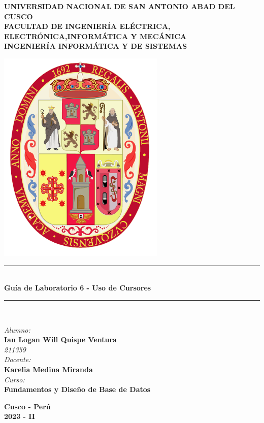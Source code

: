 \documentclass[a4paper]{article}
\begin{document}
\begin{titlepage}

\newcommand{\linea}{\rule{\linewidth}{0.7mm}} 
\center
\textbf{\Large UNIVERSIDAD NACIONAL DE SAN ANTONIO ABAD DEL CUSCO}\\[0.2cm]
\textbf{\Large FACULTAD DE INGENIERÍA ELÉCTRICA, ELECTRÓNICA,INFORMÁTICA Y MECÁNICA}\\[0.2cm]
\textbf{\Large INGENIERÍA INFORMÁTICA Y DE SISTEMAS\\[0.6cm]}

\includegraphics[width=8cm]{src/escudo-unsaac.png}
\vfill

\linea
\\[0.3cm]
\textbf{\LARGE Guía de Laboratorio 6 - Uso de Cursores}\\[0.2cm]
\linea \\
\vfill

\textit{\Large Alumno:}\\
    \textbf{\large Ian Logan Will Quispe Ventura}\\
    \textit{211359}\\

\vspace{0.3cm}
    \textit{\Large Docente:}\\
    \textbf{\large Karelia Medina Miranda}\\
\vspace{0.5cm}
    \textit{\Large Curso:}\\
    \textbf{\large Fundamentos y Diseño de Base de Datos}\\
    \vfill

\vspace{0.4cm}
    \textbf{\Large Cusco - Perú }\\
    \textbf{\large 2023 - II }\\
    \newpage
    \end{titlepage}
\end{document}
